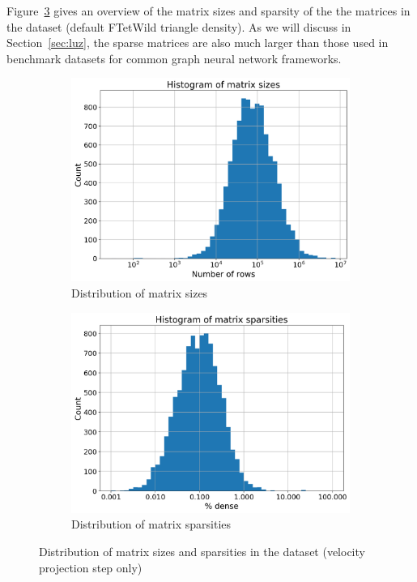 \documentclass{svproc}
\begin{document}
Figure~\ref{fig:data-set-characteristics} gives an overview of the matrix sizes and sparsity of the the matrices in the dataset (default FTetWild triangle density). As we will discuss in Section~\ref{sec:luz}, the sparse matrices are also much larger than those used in benchmark datasets for common graph neural network frameworks.

\begin{figure}
    \centering
  \begin{subfigure}{.5\textwidth}
  \centering
    \includegraphics[width=0.97\linewidth]{images/matrix_sizes.png}
  \caption{Distribution of matrix sizes }
  \label{fig:sub1}
\end{subfigure}%
\begin{subfigure}{.5\textwidth}
  \centering
  \includegraphics[width=.97\linewidth]{images/matrix_sparsities.png}
  \caption{Distribution of matrix sparsities }
  \label{fig:sub2}
\end{subfigure}
\caption{Distribution of matrix sizes and sparsities in the dataset (velocity projection step only)}
\label{fig:data-set-characteristics} 
\end{figure}
\end{document}
